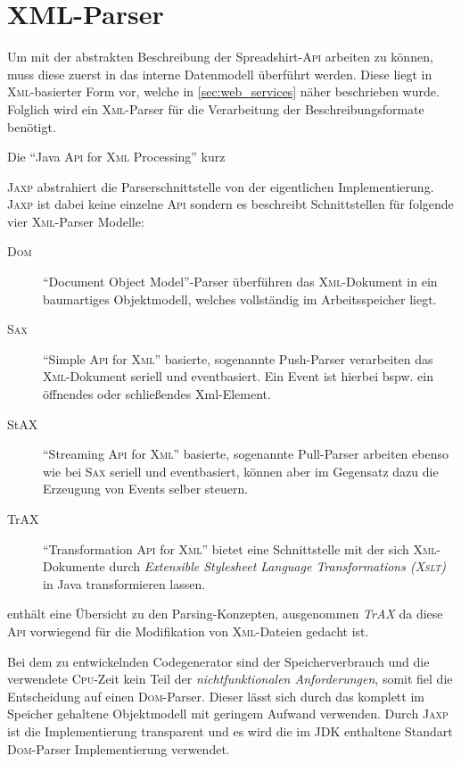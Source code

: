 \section{XML-Parser}
\label{sec:xml_parser}

Um mit der abstrakten Beschreibung der Spreadshirt-\textsc{Api} arbeiten zu können, muss diese zuerst in das interne Datenmodell überführt werden. Diese liegt in \textsc{Xml}-basierter Form vor, welche in \cref{sec:web_services} näher beschrieben wurde. Folglich wird ein \textsc{Xml}-Parser für die Verarbeitung der Beschreibungsformate benötigt.  

Die \enquote{Java \textsc{Api} for \textsc{Xml} Processing} kurz {\textsc{Jaxp} abstrahiert die Parserschnittstelle von der eigentlichen Implementierung. \textsc{Jaxp} ist dabei keine einzelne \textsc{Api} sondern es beschreibt Schnittstellen für folgende vier \textsc{Xml}-Parser Modelle:

\begin{description}
    \item[\textsc{Dom}] \enquote{Document Object Model}-Parser überführen das \textsc{Xml}-Dokument in ein baumartiges Objektmodell, welches vollständig im Arbeitsspeicher liegt.
    \item[\textsc{Sax}] \enquote{Simple \textsc{Api} for \textsc{Xml}} basierte, sogenannte Push-Parser verarbeiten das \textsc{Xml}-Dokument seriell und eventbasiert. Ein Event ist hierbei bspw. ein öffnendes oder schließendes Xml-Element.
    \item[StAX] \enquote{Streaming \textsc{Api} for \textsc{Xml}} basierte, sogenannte Pull-Parser arbeiten ebenso wie bei \textsc{Sax} seriell und eventbasiert, können aber im Gegensatz dazu die Erzeugung von Events selber steuern. 
    \item[TrAX] \enquote{Transformation \textsc{Api} for \textsc{Xml}} bietet eine Schnittstelle mit der sich \textsc{Xml}-Dokumente durch \emph{Extensible Stylesheet Language Transformations (\textsc{Xslt})} in Java transformieren lassen.
\end{description}

 enthält eine Übersicht zu den Parsing-Konzepten, ausgenommen \emph{TrAX} da diese \textsc{Api} vorwiegend für die Modifikation von \textsc{Xml}-Dateien gedacht ist.

Bei dem zu entwickelnden Codegenerator sind der Speicherverbrauch und die verwendete \textsc{Cpu}-Zeit kein Teil der \emph{nichtfunktionalen Anforderungen}, somit fiel die Entscheidung auf einen \textsc{Dom}-Parser. Dieser lässt sich durch das komplett im Speicher gehaltene Objektmodell mit geringem Aufwand verwenden. Durch \textsc{Jaxp} ist die Implementierung transparent und es wird die im \textsc{JDK} enthaltene Standart \textsc{Dom}-Parser Implementierung verwendet.

}
